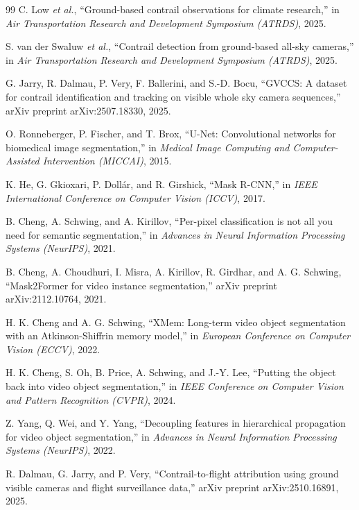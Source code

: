 \documentclass[review]{elsarticle}
\begin{document}
\begin{thebibliography}{99}
C. Low \textit{et al.}, ``Ground-based contrail observations for climate research,'' in \textit{Air Transportation Research and Development Symposium (ATRDS)}, 2025.

S. van der Swaluw \textit{et al.}, ``Contrail detection from ground-based all-sky cameras,'' in \textit{Air Transportation Research and Development Symposium (ATRDS)}, 2025.

G. Jarry, R. Dalmau, P. Very, F. Ballerini, and S.-D. Bocu, ``GVCCS: A dataset for contrail identification and tracking on visible whole sky camera sequences,'' arXiv preprint arXiv:2507.18330, 2025.

O. Ronneberger, P. Fischer, and T. Brox, ``U-Net: Convolutional networks for biomedical image segmentation,'' in \textit{Medical Image Computing and Computer-Assisted Intervention (MICCAI)}, 2015.

K. He, G. Gkioxari, P. Doll\'{a}r, and R. Girshick, ``Mask R-CNN,'' in \textit{IEEE International Conference on Computer Vision (ICCV)}, 2017.

B. Cheng, A. Schwing, and A. Kirillov, ``Per-pixel classification is not all you need for semantic segmentation,'' in \textit{Advances in Neural Information Processing Systems (NeurIPS)}, 2021.

B. Cheng, A. Choudhuri, I. Misra, A. Kirillov, R. Girdhar, and A. G. Schwing, ``Mask2Former for video instance segmentation,'' arXiv preprint arXiv:2112.10764, 2021.

H. K. Cheng and A. G. Schwing, ``XMem: Long-term video object segmentation with an Atkinson-Shiffrin memory model,'' in \textit{European Conference on Computer Vision (ECCV)}, 2022.

H. K. Cheng, S. Oh, B. Price, A. Schwing, and J.-Y. Lee, ``Putting the object back into video object segmentation,'' in \textit{IEEE Conference on Computer Vision and Pattern Recognition (CVPR)}, 2024.

Z. Yang, Q. Wei, and Y. Yang, ``Decoupling features in hierarchical propagation for video object segmentation,'' in \textit{Advances in Neural Information Processing Systems (NeurIPS)}, 2022.

R. Dalmau, G. Jarry, and P. Very, ``Contrail-to-flight attribution using ground visible cameras and flight surveillance data,'' arXiv preprint arXiv:2510.16891, 2025.


\end{thebibliography}
\end{document}
